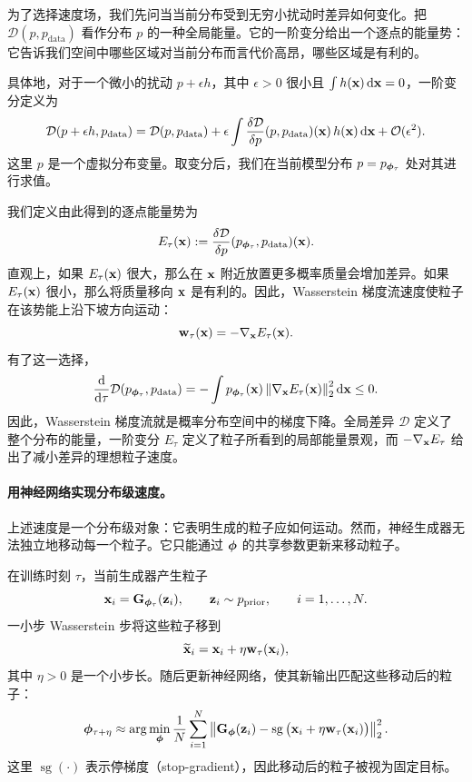为了选择速度场，我们先问当当前分布受到无穷小扰动时差异如何变化。把 $\mathcal{D}(p,p_{\mathrm{data}})$ 看作分布 $p$ 的一种全局能量。它的一阶变分给出一个逐点的能量势：它告诉我们空间中哪些区域对当前分布而言代价高昂，哪些区域是有利的。

具体地，对于一个微小的扰动 $p+\epsilon h$，其中 $\epsilon>0$ 很小且 $\int h({\mathbf{x}})\mathop{}\!\mathrm{d}{\mathbf{x}}=0$，一阶变分定义为
\[
    \mathcal{D}(p+\epsilon h,p_{\mathrm{data}})
    =
    \mathcal{D}(p,p_{\mathrm{data}})
    +
    \epsilon
    \int
    \frac{\delta\mathcal{D}}{\delta p}
    (p,p_{\mathrm{data}})({\mathbf{x}})\,
    h({\mathbf{x}})\mathop{}\!\mathrm{d}{\mathbf{x}}
    +
    \mathcal{O}(\epsilon^2).
\]
这里 $p$ 是一个虚拟分布变量。取变分后，我们在当前模型分布 $p=p_{{\bm{\phi}}_\tau}$ 处对其进行求值。

我们定义由此得到的逐点能量势为
\[
    E_\tau({\mathbf{x}})
    :=
    \frac{\delta\mathcal{D}}{\delta p}
    (p_{{\bm{\phi}}_\tau},p_{\mathrm{data}})({\mathbf{x}}).
\]
直观上，如果 $E_\tau({\mathbf{x}})$ 很大，那么在 ${\mathbf{x}}$ 附近放置更多概率质量会增加差异。如果 $E_\tau({\mathbf{x}})$ 很小，那么将质量移向 ${\mathbf{x}}$ 是有利的。因此，Wasserstein 梯度流速度使粒子在该势能上沿下坡方向运动：
\[
    {\mathbf{w}}_\tau({\mathbf{x}})
    =
    -
    \nabla_{{\mathbf{x}}}E_\tau({\mathbf{x}}).
\]
有了这一选择，
\[
    \frac{\mathop{}\!\mathrm{d}}{\mathop{}\!\mathrm{d} \tau}
    \mathcal{D}(p_{{\bm{\phi}}_\tau},p_{\mathrm{data}})
    =
    -
    \int
    p_{{\bm{\phi}}_\tau}({\mathbf{x}})
    \left\|
        \nabla_{{\mathbf{x}}}E_\tau({\mathbf{x}})
    \right\|_2^2
    \mathop{}\!\mathrm{d}{\mathbf{x}}
    \le 0.
\]
因此，Wasserstein 梯度流就是概率分布空间中的梯度下降。全局差异 $\mathcal{D}$ 定义了整个分布的能量，一阶变分 $E_\tau$ 定义了粒子所看到的局部能量景观，而 $-\nabla_{{\mathbf{x}}}E_\tau$ 给出了减小差异的理想粒子速度。

\paragraph{用神经网络实现分布级速度。}
上述速度是一个分布级对象：它表明生成的粒子应如何运动。然而，神经生成器无法独立地移动每一个粒子。它只能通过 ${\bm{\phi}}$ 的共享参数更新来移动粒子。

在训练时刻 $\tau$，当前生成器产生粒子
\[
    {\mathbf{x}}_i
    =
    {\mathbf{G}}_{{\bm{\phi}}_\tau}({\mathbf{z}}_i),
    \qquad
    {\mathbf{z}}_i\sim p_{\mathrm{prior}},
    \qquad
    i=1,\ldots,N.
\]
一小步 Wasserstein 步将这些粒子移到
\[
    \widetilde{{\mathbf{x}}}_i
    =
    {\mathbf{x}}_i+\eta{\mathbf{w}}_\tau({\mathbf{x}}_i),
\]
其中 $\eta>0$ 是一个小步长。随后更新神经网络，使其新输出匹配这些移动后的粒子：
\[
    {\bm{\phi}}_{\tau+\eta}
    \approx
    \arg\min_{{\bm{\phi}}}
    \frac{1}{N}
    \sum_{i=1}^N
    \left\|
        {\mathbf{G}}_{{\bm{\phi}}}({\mathbf{z}}_i)
        -
        \operatorname{sg}
        \big(
            {\mathbf{x}}_i+\eta{\mathbf{w}}_\tau({\mathbf{x}}_i)
        \big)
    \right\|_2^2.
\]
这里 $\operatorname{sg}(\cdot)$ 表示停梯度（stop-gradient），因此移动后的粒子被视为固定目标。

